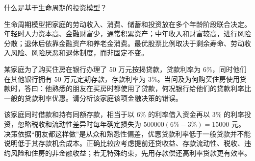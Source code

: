 \begin{problem}
 什么是基于生命周期的投资模型？
\end{problem}
\begin{solution}
生命周期模型把家庭的劳动收入、消费、储蓄和投资放在多个年龄阶段联合决定。年轻时人力资本高、金融财富少，通常积累资产；中年收入和财富较高，进行风险分散；退休后依靠金融资产和养老金消费。最优股票比例取决于剩余寿命、劳动收入风险、风险厌恶和退休制度，而非固定不变。
\end{solution}
\begin{problem}
 某家庭为了购买住房在银行办理了 \num{50} 万元按揭贷款，贷款利率为 $6\%$，同时他们在其他银行拥有 \num{50} 万元定期存款，存款利率为 $3\%$。当问及为何购买住房使用贷款时，答曰：他熟悉的朋友在买房时都使用了贷款，何况银行给他们的贷款利率比一般的贷款利率优惠。请分析该家庭该项金融决策的错误。
\end{problem}
\begin{solution}
该家庭同时借款和持有同额存款，相当于以 $6\%$ 的利率借入资金再以 $3\%$ 的利率投资，忽略税收和流动性差异时每年确定损失为 $500000(6\%-3\%)=15000$ 元。决策依据“朋友都这样做”是从众和熟悉性偏差，优惠贷款利率低于一般贷款并不能说明低于其存款机会成本。正确比较应考虑提前还贷收益、存款流动性、税收、违约风险和住房的非金融收益；若无特殊约束，先用存款偿还高利率贷款更有效率。
\end{solution}
